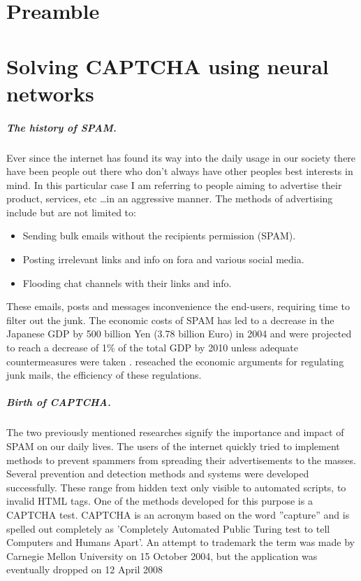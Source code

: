 \documentclass[pdftex,a4paper,12pt,twoside]{report}
\begin{document}
\chapter*{Preamble}
\label{ch:preamble}



\chapter{Solving CAPTCHA using neural networks}
\label{ch:introduction}
\paragraph{The history of SPAM.} 
Ever since the internet has found its way into the daily usage in our society there have been people out there who don't always have other peoples best interests in mind. In this particular case I am referring to people aiming to advertise their product, services, etc \ldots in an aggressive manner. The methods of advertising include but are not limited to: \begin{itemize}
\item Sending bulk emails without the recipients permission (SPAM). 
\item Posting irrelevant links and info on fora and various social media.
\item Flooding chat channels with their links and info. 
\end{itemize}
These emails, posts and messages inconvenience the end-users, requiring time to filter out the junk. The economic costs of SPAM has led to a decrease in the Japanese GDP by 500 billion Yen (3.78 billion Euro) in 2004 and were projected to reach a decrease of 1\% of the total GDP by 2010 unless adequate countermeasures were taken \citep{Ukai2007}. \citep{Khong2004} reseached the economic arguments for regulating junk mails, the efficiency of these regulations.
\paragraph{Birth of CAPTCHA.} 
The two previously mentioned researches signify the importance and impact of SPAM on our daily lives. The users of the internet quickly tried to implement methods to prevent spammers from spreading their advertisements to the masses. Several prevention and detection methods and systems were developed successfully. These range from hidden text only visible to automated scripts, to invalid HTML tags. One of the methods developed for this purpose is a CAPTCHA test. CAPTCHA is an acronym based on the word ''capture'' and is spelled out completely as 'Completely Automated Public Turing test to tell Computers and Humans Apart'. An attempt to trademark  the term was made by Carnegie Mellon University on 15 October 2004, but the application was eventually dropped on 12 April 2008
\end{document}
